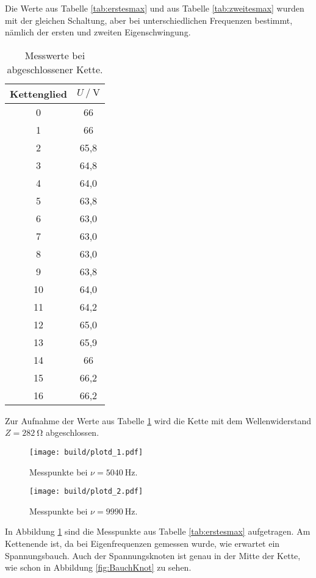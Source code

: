 Die Werte aus Tabelle \ref{tab:erstesmax} und aus Tabelle \ref{tab:zweitesmax}
wurden mit der gleichen Schaltung, aber bei unterschiedlichen Frequenzen bestimmt,
nämlich der ersten und zweiten Eigenschwingung.


\begin{table}[h]
  \centering
  \caption{Messwerte bei abgeschlossener Kette.}
  \label{tab:absw=wellw}
  \begin{tabular}{c c}
    \toprule
     Kettenglied & $U \:/\: \si{\volt}$\\
    \midrule
    0 & 66\\
    1 & 66\\
    2 & 65,8\\
    3 & 64,8\\
    4 & 64,0\\
    5 & 63,8\\
    6 & 63,0\\
    7 & 63,0\\
    8 & 63,0\\
    9 & 63,8\\
    10 & 64,0\\
    11 & 64,2\\
    12 & 65,0\\
    13 & 65,9\\
    14 & 66\\
    15 & 66,2\\
    16 & 66,2\\
    \bottomrule
  \end{tabular}
\end{table}

Zur Aufnahme der Werte aus Tabelle \ref{tab:absw=wellw} wird die Kette mit dem
Wellenwiderstand $Z = \SI{282}{\ohm}$ abgeschlossen.

\begin{figure}[h]
  \centering
  \texttt{[image: build/plotd\_1.pdf]}
  \caption{Messpunkte bei $\nu = \SI{5040}{\hertz}$.}
  \label{fig:erstesmax}
\end{figure}

\begin{figure}[h]
  \centering
  \texttt{[image: build/plotd\_2.pdf]}
  \caption{Messpunkte bei $\nu = \SI{9990}{\hertz}$.}
  \label{fig:zweitesmax}
\end{figure}

In Abbildung \ref{fig:erstesmax} sind die Messpunkte aus Tabelle \ref{tab:erstesmax}
aufgetragen. Am Kettenende ist, da bei Eigenfrequenzen gemessen  wurde,
 wie erwartet ein Spannungsbauch. Auch der Spannungsknoten ist genau in der Mitte der Kette, wie schon
 in  Abbildung \ref{fig:BauchKnot} zu sehen.

